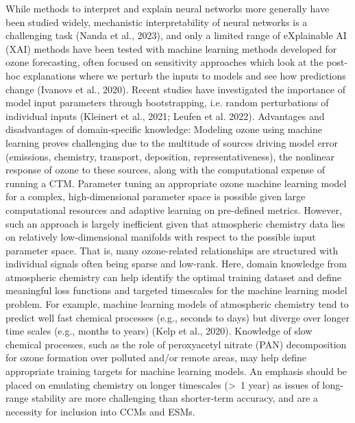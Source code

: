 \documentclass[gmd, manuscript]{copernicus}
\begin{document}
While methods to interpret and explain neural networks more generally have been studied widely, mechanistic interpretability of neural networks is a challenging task (Nanda et al., 2023), and only a limited range of eXplainable AI (XAI) methods have been tested with machine learning methods developed for ozone forecasting, often focused on sensitivity approaches which look at the post-hoc explanations where we perturb the inputs to models and see how predictions change (Ivanovs et al., 2020). Recent studies have investigated the importance of model input parameters through bootstrapping, i.e. random perturbations of individual inputs (Kleinert et al., 2021; Leufen et al. 2022).
Advantages and disadvantages of domain-specific knowledge:
Modeling ozone using machine learning proves challenging due to the multitude of sources driving model error (emissions, chemistry, transport, deposition, representativeness), the nonlinear response of ozone to these sources, along with the computational expense of running a CTM. Parameter tuning an appropriate ozone machine learning model for a complex, high-dimensional parameter space is possible given large computational resources and adaptive learning on pre-defined metrics. However, such an approach is largely inefficient given that atmospheric chemistry data lies on relatively low-dimensional manifolds with respect to the possible input parameter space. That is, many ozone-related relationships are structured with individual signals often being sparse and low-rank. Here, domain knowledge from atmospheric chemistry can help identify the optimal training dataset and define meaningful loss functions and targeted timescales for the machine learning model problem. For example, machine learning models of atmospheric chemistry tend to predict well fast chemical processes (e.g., seconds to days) but diverge over longer time scales (e.g., months to years) (Kelp et al., 2020). Knowledge of slow chemical processes, such as the role of peroxyacetyl nitrate (PAN) decomposition for ozone formation over polluted and/or remote areas, may help define appropriate training targets for machine learning models. An emphasis should be placed on emulating chemistry on longer timescales (>~1 year) as issues of long-range stability are more challenging than shorter-term accuracy, and are a necessity for inclusion into CCMs and ESMs. 
\end{document}
